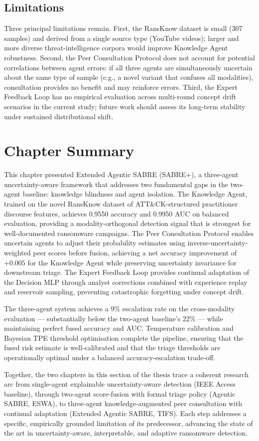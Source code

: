 \subsection{Limitations}

Three principal limitations remain. First, the RansKnow dataset is small (307 samples) and derived from a single source type (YouTube videos); larger and more diverse threat-intelligence corpora would improve Knowledge Agent robustness. Second, the Peer Consultation Protocol does not account for potential correlations between agent errors: if all three agents are simultaneously uncertain about the same type of sample (e.g., a novel variant that confuses all modalities), consultation provides no benefit and may reinforce errors. Third, the Expert Feedback Loop has no empirical evaluation across multi-round concept drift scenarios in the current study; future work should assess its long-term stability under sustained distributional shift.


\section{Chapter Summary}
\label{sec:tifs_summary}

This chapter presented Extended Agentic SABRE (SABRE+), a three-agent uncertainty-aware framework that addresses two fundamental gaps in the two-agent baseline: knowledge blindness and agent isolation. The Knowledge Agent, trained on the novel RansKnow dataset of ATT\&CK-structured practitioner discourse features, achieves 0.9550 accuracy and 0.9950 AUC on balanced evaluation, providing a modality-orthogonal detection signal that is strongest for well-documented ransomware campaigns. The Peer Consultation Protocol enables uncertain agents to adjust their probability estimates using inverse-uncertainty-weighted peer scores before fusion, achieving a net accuracy improvement of $+0.005$ for the Knowledge Agent while preserving uncertainty invariance for downstream triage. The Expert Feedback Loop provides continual adaptation of the Decision MLP through analyst corrections combined with experience replay and reservoir sampling, preventing catastrophic forgetting under concept drift.

The three-agent system achieves a 9\% escalation rate on the cross-modality evaluation — substantially below the two-agent baseline's 22\% — while maintaining perfect fused accuracy and AUC. Temperature calibration and Bayesian TPE threshold optimisation complete the pipeline, ensuring that the fused risk estimate is well-calibrated and that the triage thresholds are operationally optimal under a balanced accuracy-escalation trade-off.

Together, the two chapters in this section of the thesis trace a coherent research arc from single-agent explainable uncertainty-aware detection (IEEE Access baseline), through two-agent score-fusion with formal triage policy (Agentic SABRE, ESWA), to three-agent knowledge-augmented peer consultation with continual adaptation (Extended Agentic SABRE, TIFS). Each step addresses a specific, empirically grounded limitation of its predecessor, advancing the state of the art in uncertainty-aware, interpretable, and adaptive ransomware detection.
